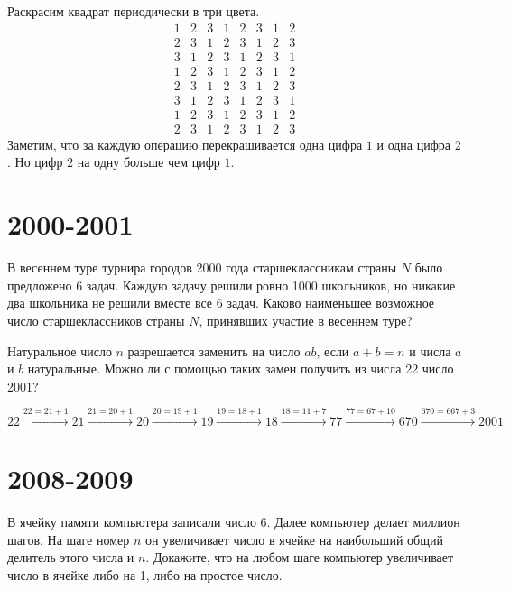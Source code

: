\documentclass[11pt, a4paper]{template}
\begin{document}
\begin{solution}
Раскрасим квадрат периодически в три цвета.
$$
\begin{matrix}
1 & 2 & 3 & 1 & 2 & 3 & 1 & 2 \\
2 & 3 & 1 & 2 & 3 & 1 & 2 & 3 \\
3 & 1 & 2 & 3 & 1 & 2 & 3 & 1 \\
1 & 2 & 3 & 1 & 2 & 3 & 1 & 2 \\
2 & 3 & 1 & 2 & 3 & 1 & 2 & 3 \\
3 & 1 & 2 & 3 & 1 & 2 & 3 & 1 \\ 
1 & 2 & 3 & 1 & 2 & 3 & 1 & 2 \\
2 & 3 & 1 & 2 & 3 & 1 & 2 & 3 
\end{matrix}
$$
Заметим, что за каждую операцию перекрашивается одна цифра $1$ и одна цифра $2$. Но цифр $2$ на одну больше чем цифр $1$. 
\end{solution}

\chapter{2000-2001}

\begin{exercise}
В весеннем туре турнира городов 2000 года старшеклассникам страны $N$ было предложено 6 задач. Каждую задачу решили ровно 1000 школьников, но никакие два школьника не решили вместе все 6 задач. Каково наименьшее возможное число старшеклассников страны $N$, принявших участие в весеннем туре?
\end{exercise}

\begin{exercise}
Натуральное число $n$ разрешается заменить на число $ab$, если $a + b = n$ и числа $a$ и $b$ натуральные. Можно ли с помощью таких замен получить из числа 22 число 2001?
\end{exercise}

\begin{solution}
$$
22 \xrightarrow{22 = 21 + 1} 21 \xrightarrow{21 = 20 + 1} 20 \xrightarrow{20 = 19 + 1} 19 \xrightarrow{19 = 18+1} 18 \xrightarrow {18 = 11 + 7} 77 \xrightarrow{77 = 67 + 10} 670 \xrightarrow{670=667+3} 2001
$$
\end{solution}

\chapter{2008-2009}

\begin{exercise}
В ячейку памяти компьютера записали число 6. Далее компьютер делает миллион шагов. На шаге номер $n$ он увеличивает число в ячейке на наибольший общий делитель этого числа и $n$. Докажите, что на любом шаге компьютер увеличивает число в ячейке либо на 1, либо на простое число.
\end{exercise}
\end{document}
